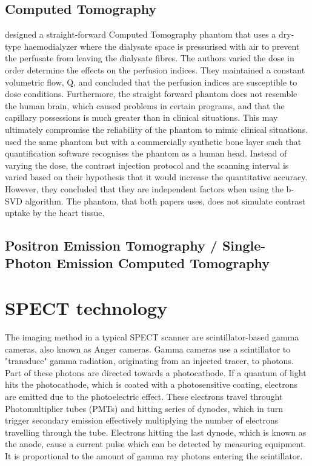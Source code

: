 \subsection{Computed Tomography}
\cite{suzuki2017quantitative} designed a straight-forward Computed Tomography phantom that uses a dry-type haemodialyzer where the dialysate space is pressurised with air to prevent the perfusate from leaving the dialysate fibres. The authors varied the dose in order determine the effects on the perfusion indices. They maintained a constant volumetric flow, Q, and concluded that the perfusion indices are susceptible to dose conditions. Furthermore, the straight forward phantom does not resemble the human brain, which caused problems in certain programs, and that the capillary possessions is much greater than in clinical situations. This may ultimately compromise the reliability of the phantom to mimic clinical situations. \cite{hashimoto2018effect} used the same phantom but with a commercially synthetic bone layer such that quantification software recognises the phantom as a human head. Instead of varying the dose, the contrast injection protocol and the scanning interval is varied based on their hypothesis that it would increase the quantitative accuracy. However, they concluded that they are independent factors when using the b-SVD algorithm. The phantom, that both papers uses, does not simulate contrast uptake by the heart tissue.
\subsection{Positron Emission Tomography / Single-Photon Emission Computed Tomography}

\section{SPECT technology}
The imaging method in a typical SPECT scanner are scintillator-based gamma cameras, also known as Anger cameras. Gamma cameras use a scintillator to "transduce" gamma radiation, originating from an injected tracer, to photons. Part of these photons are directed towards a photocathode. If a quantum of light hits the photocathode, which is coated with a photosensitive coating, electrons are emitted due to the photoelectric effect. These electrons travel throught Photomultiplier tubes (PMTs) and hitting series of dynodes, which in turn trigger secondary emission effectively multiplying the number of electrons travelling through the tube. Electrons hitting the last dynode, which is known as the anode, cause a current pulse which can be detected by measuring equipment. It is proportional to the amount of gamma ray photons entering the scintillator\citep{CZTTech2009}.

